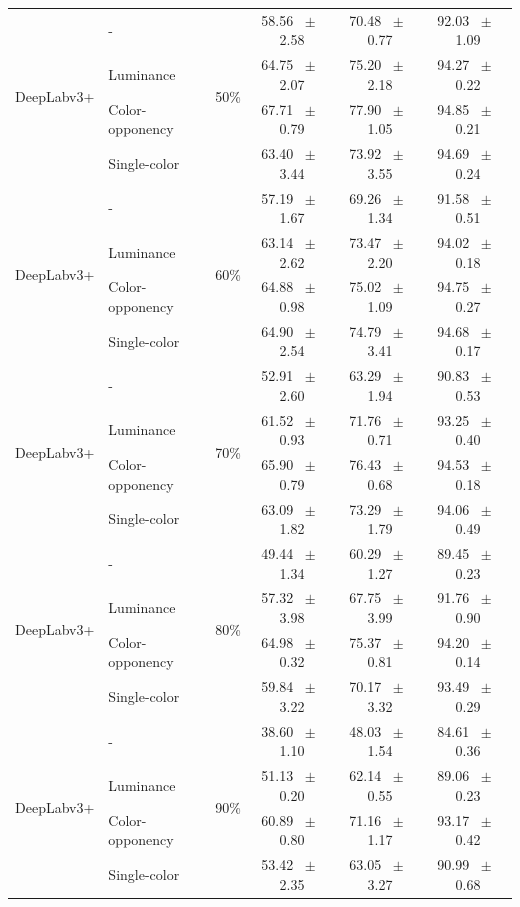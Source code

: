 \begin{table}[h]
\begin{tabular}{@{}l l c c c c@{}}
    \multirow{4}{*}{DeepLabv3+} & - & \multirow{4}{*}{50\%} & 58.56 ~$\pm$~ 2.58 & 70.48 ~$\pm$~ 0.77 & 92.03 ~$\pm$~ 1.09 \\
    & Luminance &  & 64.75 ~$\pm$~ 2.07 & 75.20 ~$\pm$~ 2.18 & 94.27 ~$\pm$~ 0.22 \\
    & Color-opponency &  & 67.71 ~$\pm$~ 0.79 & 77.90 ~$\pm$~ 1.05 & 94.85 ~$\pm$~ 0.21 \\
    & Single-color &  & 63.40 ~$\pm$~ 3.44 & 73.92 ~$\pm$~ 3.55 & 94.69 ~$\pm$~ 0.24 \\
    \midrule
    \multirow{4}{*}{DeepLabv3+} & - & \multirow{4}{*}{60\%} & 57.19 ~$\pm$~ 1.67 & 69.26 ~$\pm$~ 1.34 & 91.58 ~$\pm$~ 0.51 \\
    & Luminance &  & 63.14 ~$\pm$~ 2.62 & 73.47 ~$\pm$~ 2.20 & 94.02 ~$\pm$~ 0.18 \\
    & Color-opponency &  & 64.88 ~$\pm$~ 0.98 & 75.02 ~$\pm$~ 1.09 & 94.75 ~$\pm$~ 0.27 \\
    & Single-color &  & 64.90 ~$\pm$~ 2.54 & 74.79 ~$\pm$~ 3.41 & 94.68 ~$\pm$~ 0.17 \\
    \midrule
    \multirow{4}{*}{DeepLabv3+} & - & \multirow{4}{*}{70\%} & 52.91 ~$\pm$~ 2.60 & 63.29 ~$\pm$~ 1.94 & 90.83 ~$\pm$~ 0.53 \\
    & Luminance &  & 61.52 ~$\pm$~ 0.93 & 71.76 ~$\pm$~ 0.71 & 93.25 ~$\pm$~ 0.40 \\
    & Color-opponency &  & 65.90 ~$\pm$~ 0.79 & 76.43 ~$\pm$~ 0.68 & 94.53 ~$\pm$~ 0.18 \\
    & Single-color &  & 63.09 ~$\pm$~ 1.82 & 73.29 ~$\pm$~ 1.79 & 94.06 ~$\pm$~ 0.49 \\
    \midrule
    \multirow{4}{*}{DeepLabv3+} & - & \multirow{4}{*}{80\%} & 49.44 ~$\pm$~ 1.34 & 60.29 ~$\pm$~ 1.27 & 89.45 ~$\pm$~ 0.23 \\
    & Luminance &  & 57.32 ~$\pm$~ 3.98 & 67.75 ~$\pm$~ 3.99 & 91.76 ~$\pm$~ 0.90 \\
    & Color-opponency &  & 64.98 ~$\pm$~ 0.32 & 75.37 ~$\pm$~ 0.81 & 94.20 ~$\pm$~ 0.14 \\
    & Single-color &  & 59.84 ~$\pm$~ 3.22 & 70.17 ~$\pm$~ 3.32 & 93.49 ~$\pm$~ 0.29 \\
    \midrule
    \multirow{4}{*}{DeepLabv3+} & - & \multirow{4}{*}{90\%} & 38.60 ~$\pm$~ 1.10 & 48.03 ~$\pm$~ 1.54 & 84.61 ~$\pm$~ 0.36 \\
    & Luminance &  & 51.13 ~$\pm$~ 0.20 & 62.14 ~$\pm$~ 0.55 & 89.06 ~$\pm$~ 0.23 \\
    & Color-opponency &  & 60.89 ~$\pm$~ 0.80 & 71.16 ~$\pm$~ 1.17 & 93.17 ~$\pm$~ 0.42 \\
    & Single-color &  & 53.42 ~$\pm$~ 2.35 & 63.05 ~$\pm$~ 3.27 & 90.99 ~$\pm$~ 0.68 \\
    \midrule
    \bottomrule
  \end{tabular}
  \label{tab:deeplabv3plus_cityscapes}
\end{table}